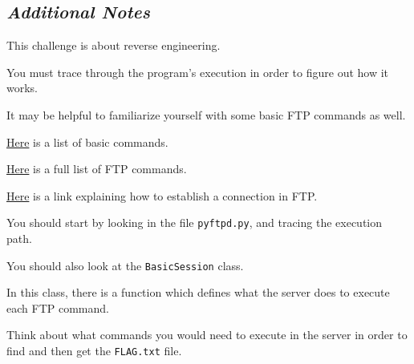 {{{                \subsection*{\textit{Additional Notes}}



                    This challenge is about reverse engineering. %



You must trace through the program's execution in order to figure out how it works. %



It may be helpful to familiarize yourself with some basic FTP commands as well. 







                    \href{https://kb.iu.edu/d/aenq}{Here} is a list of basic commands.







                    \href{https://en.wikipedia.org/wiki/List_of_FTP_commands}{Here} is a full list of FTP commands.







                    \href{https://www.serv-u.com/resource/tutorial/pasv-response-epsv-port-pbsz-rein-ftp-command#fac52a38-7ddb-4815-a9dc-72cc03c0a8e6}{Here} is a link explaining how to establish a connection in FTP.







                    You should start by looking in the file \lstinline`pyftpd.py`, and tracing the execution path. %



You should also look at the \lstinline`BasicSession` class. %



In this class, there is a function which defines what the server does to execute each FTP command. %



Think about what commands you would need to execute in the server in order to find and then get the \lstinline`FLAG.txt` file. 







}}}
